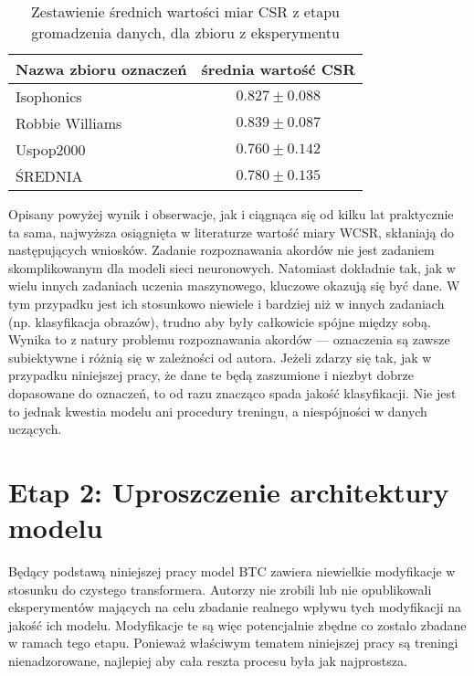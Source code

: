 \begin{table}
    \centering
    \caption{Zestawienie średnich wartości miar CSR z etapu gromadzenia danych, dla zbioru z eksperymentu }
    \label{tab:results_btc-reproduce_extra}
    \begin{tabular}{|l|c|}
        \hline Nazwa zbioru oznaczeń & średnia wartość CSR \\ \hline
        Isophonics  & $0.827 \pm 0.088$ \\
        Robbie Williams & $0.839 \pm 0.087$ \\
        Uspop2000 & $0.760 \pm 0.142$ \\
        \hline ŚREDNIA & $0.780 \pm 0.135$ \\ \hline
    \end{tabular}
\end{table}

Opisany powyżej wynik i obserwacje, jak i ciągnąca się od kilku lat praktycznie ta sama, najwyższa osiągnięta w literaturze wartość miary WCSR, skłaniają do następujących wniosków. Zadanie rozpoznawania akordów nie jest zadaniem skomplikowanym dla modeli sieci neuronowych. Natomiast dokładnie tak, jak w wielu innych zadaniach uczenia maszynowego, kluczowe okazują się być dane. W tym przypadku jest ich stosunkowo niewiele i bardziej niż w innych zadaniach (np. klasyfikacja obrazów), trudno aby były całkowicie spójne między sobą. Wynika to z natury problemu rozpoznawania akordów --- oznaczenia są zawsze subiektywne i różnią się w zależności od autora. Jeżeli zdarzy się tak, jak w przypadku niniejszej pracy, że dane te będą zaszumione i niezbyt dobrze dopasowane do oznaczeń, to od razu znacząco spada jakość klasyfikacji. Nie jest to jednak kwestia modelu ani procedury treningu, a niespójności w danych uczących.

\section{Etap 2: Uproszczenie architektury modelu}

Będący podstawą niniejszej pracy model BTC zawiera niewielkie modyfikacje w stosunku do czystego transformera. Autorzy nie zrobili lub nie opublikowali eksperymentów mających na celu zbadanie realnego wpływu tych modyfikacji na jakość ich modelu. Modyfikacje te są więc potencjalnie zbędne co zostało zbadane w ramach tego etapu. Ponieważ właściwym tematem niniejszej pracy są treningi nienadzorowane, najlepiej aby cała reszta procesu była jak najprostsza. 

